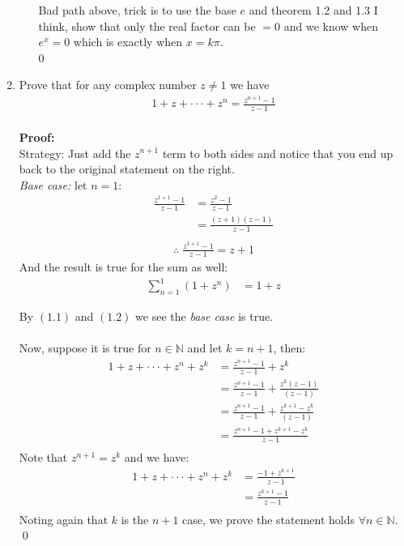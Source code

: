 \begin{enumerate}
\begin{enumerate}
		Bad path above, trick is to use the base $e$ and theorem 1.2 and 1.3 I think, show that only the real factor can be $= 0$ and we know when $e^x = 0$ which
		is exactly when $x = k\pi.$
		\\0
		

	\end{enumerate}

	\item Prove that for any complex number $z \neq 1$ we have
	\begin{align*}
		1 + z + \cdot\cdot\cdot + z^n = \frac{z^{n + 1} - 1}{z - 1} \\
	\end{align*}

	\textbf{Proof:} \\
	Strategy: Just add the $z^{n + 1}$ term to both sides and notice that you end up back to the original statement on the right. \\

	\emph{Base case:} let $n = 1$:
	\begin{align*}
		\frac{z^{1 + 1} - 1}{z -1} &= \frac{z^2 - 1}{z - 1} \\
		&= \frac{(z + 1)(z - 1)}{z - 1} \\
	\end{align*}
	\begin{align}
		\therefore \; \frac{z^{1 + 1} - 1}{z -1} = z + 1
	\end{align}
	And the result is true for the sum as well:
	\begin{align}
		\sum_{n = 1}^{1} (1 + z^n) &= 1 + z
	\end{align}

	By $(1.1)$ and $(1.2)$ we see the \emph{base case} is true. \\
	\\
	Now, suppose it is true for $n \in \mathbb{N}$ and let $k = n + 1$, then:
	\begin{align*}
		1 + z + \cdot\cdot\cdot + z^n + z^k &= \frac{z^{n + 1} - 1}{z - 1} + z^k \\
		&= \frac{z^{n + 1} - 1}{z - 1} + \frac{z^k(z - 1)}{(z - 1)} \\
		&= \frac{z^{n + 1} - 1}{z - 1} + \frac{z^{k + 1} - z^k}{(z - 1)} \\
		&= \frac{z^{n + 1} - 1 + z^{k + 1} - z^k}{z - 1} \\ 
	\end{align*}
	Note that $z^{n + 1} = z^k$ and we have:
	\begin{align*}
		1 + z + \cdot\cdot\cdot + z^n + z^k &= \frac{ - 1 + z^{k + 1}}{z - 1} \\
		&= \frac{z^{k + 1} - 1}{z - 1} \\
	\end{align*}
	Noting again that $k$ is the $n + 1$ case, we prove the statement holds $\forall n \in \mathbb{N}.$
	\qed 


\end{enumerate}
